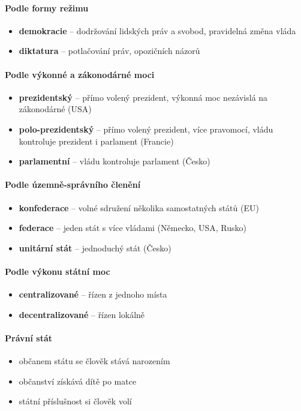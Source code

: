 \paragraph{Podle formy režimu}
\begin{itemize}
\item \textbf{demokracie} -- dodržování lidských práv a svobod, pravidelná změna vláda
\item \textbf{diktatura} -- potlačování práv, opozičních názorů
\end{itemize}

\paragraph{Podle výkonné a zákonodárné moci}
\begin{itemize}
\item \textbf{prezidentský} -- přímo volený prezident, výkonná moc nezávislá na zákonodárné (USA)
\item \textbf{polo-prezidentský} -- přímo volený prezident, více pravomocí, vládu kontroluje prezident i parlament (Francie)
\item \textbf{parlamentní} -- vládu kontroluje parlament (Česko)
\end{itemize}

\paragraph{Podle územně-správního členění}
\begin{itemize}
\item \textbf{konfederace} -- volné sdružení několika samostatných států (EU)
\item \textbf{federace}  -- jeden stát s více vládami (Německo, USA, Rusko)
\item \textbf{unitární stát} -- jednoduchý stát (Česko)
\end{itemize}

\paragraph{Podle výkonu státní moc}
\begin{itemize}
\item \textbf{centralizované} -- řízen z jednoho místa
\item \textbf{decentralizované} -- řízen lokálně
\end{itemize}

\paragraph{Právní stát}
\begin{itemize}
\item občanem státu se člověk stává narozením
\item občanství získává dítě po matce
\item státní příslušnost si člověk volí
\end{itemize}

